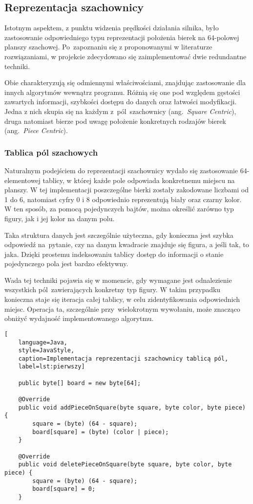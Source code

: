 \subsection{Reprezentacja szachownicy}
\label{subsec:reprezentacja-szachownicy}

Istotnym aspektem, z punktu widzenia prędkości działania silnika, było zastosowanie odpowiedniego typu reprezentacji położenia bierek na 64-polowej planszy szachowej.
Po~zapoznaniu się z proponowanymi w literaturze rozwiązaniami, w projekcie zdecydowano się zaimplementować dwie redundantne techniki.

Obie charakteryzują się odmiennymi właściwościami, znajdując zastosowanie dla innych algorytmów wewnątrz programu.
Różnią się one pod względem gęstości zawartych informacji, szybkości dostępu do danych oraz łatwości modyfikacji.
Jedna z nich skupia się na każdym z~pól~szachownicy (ang.~\emph{Square Centric}), druga natomiast bierze pod uwagę położenie konkretnych rodzajów bierek (ang.~\emph{Piece Centric}).

\subsubsection{Tablica pól szachowych}

Naturalnym podejściem do reprezentacji szachownicy wydało się zastosowanie 64-elementowej tablicy, w której każde pole odpowiada konkretnemu miejscu na planszy.
W tej implementacji poszczególne bierki zostały zakodowane liczbami od 1 do 6, natomiast cyfry 0 i 8 odpowiednio reprezentują biały oraz czarny kolor.
W ten sposób, za pomocą pojedynczych bajtów, można określić zarówno typ figury, jak i jej kolor na danym polu.

Taka struktura danych jest szczególnie użyteczna, gdy konieczna jest szybka odpowiedź na~pytanie, czy na danym kwadracie znajduje się figura, a jeśli tak, to jaka.
Dzięki prostemu indeksowaniu tablicy dostęp do informacji o stanie pojedynczego pola jest bardzo efektywny.

Wada tej techniki pojawia się w momencie, gdy wymagane jest odnalezienie wszystkich pól~zawierających konkretny typ figury.
W takim przypadku konieczna staje się iteracja całej tablicy, w celu zidentyfikowania odpowiednich miejsc.
Operacja ta, szczególnie przy~wielokrotnym wywołaniu, może znacząco obniżyć wydajność implementowanego algorytmu.

\begin{lstlisting}[
    language=Java,
    style=JavaStyle,
    caption=Implementacja reprezentacji szachownicy tablicą pól,
    label=lst:pierwszy]

    public byte[] board = new byte[64];

    @Override
    public void addPieceOnSquare(byte square, byte color, byte piece) {
        square = (byte) (64 - square);
        board[square] = (byte) (color | piece);
    }

    @Override
    public void deletePieceOnSquare(byte square, byte color, byte piece) {
        square = (byte) (64 - square);
        board[square] = 0;
    }

\end{lstlisting}


